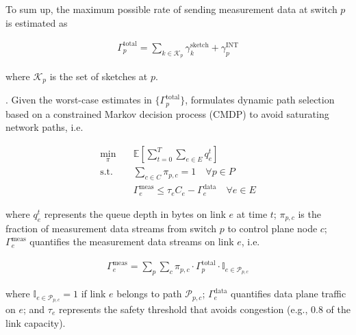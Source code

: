 To sum up, the maximum possible rate of sending measurement data at switch $p$ is estimated as

\vspace{-4pt}
\begin{align}
\Gamma_p^{\text{total}} = \sum_{k \in \mathcal{K}_p} \gamma_k^{\text{sketch}} + \gamma_p^{\text{INT}}
\end{align}

\noindent where $\mathcal{K}_p$ is the set of sketches at $p$. 


. Given the worst-case estimates in $\{\Gamma_p^{\text{total}}\}$, \sysname formulates dynamic path selection based on a constrained Markov decision process (CMDP) to avoid saturating network paths, i.e.

\vspace{-4pt}
\begin{align}
\min_{\pi}  & \quad \mathbb{E}\left[\sum_{t=0}^T \sum_{e \in E} q_e^t \right] \\
\text{s.t.} & \quad \sum_{c \in C} \pi_{p,c} = 1 \quad \forall p \in P  \\
            & \quad \Gamma_e^{\text{meas}} \leq \tau_e C_e - \Gamma_e^{\text{data}} \quad \forall e \in E 
\end{align}

\noindent where $q_e^t$ represents the queue depth in bytes on link $e$ at time $t$; $\pi_{p,c}$ is the fraction of measurement data streams from switch $p$ to control plane node $c$; $\Gamma_e^{\text{meas}}$ quantifies the measurement data streams on link $e$, i.e. 

\vspace{-4pt}
\begin{align}
    \Gamma_e^{\text{meas}} = \sum_{p} \sum_{c} \pi_{p,c} \cdot \Gamma_p^{\text{total}} \cdot \mathbb{I}_{e \in \mathcal{P}_{p,c}}
\end{align}

\noindent where $\mathbb{I}_{e \in \mathcal{P}_{p,c}}=1$ if link $e$ belongs to path $\mathcal{P}_{p,c}$; $\Gamma_e^{\text{data}}$ quantifies data plane traffic on $e$; and $\tau_e$ represents the safety threshold that avoids congestion (e.g., 0.8 of the link capacity).

